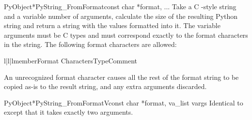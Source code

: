 \begin{cfuncdesc}{PyObject*}{PyString_FromFormat}{const char *format, ...}
  Take a C -style  string and a
  variable number of arguments, calculate the size of the resulting
  Python string and return a string with the values formatted into
  it.  The variable arguments must be C types and must correspond
  exactly to the format characters in the  string.  The
  following format characters are allowed:




  \begin{tableiii}{l|l|l}{member}{Format Characters}{Type}{Comment}
  \end{tableiii}

  An unrecognized format character causes all the rest of the format
  string to be copied as-is to the result string, and any extra
  arguments discarded.
\end{cfuncdesc}

\begin{cfuncdesc}{PyObject*}{PyString_FromFormatV}{const char *format,
                                                   va_list vargs}
  Identical to  except that it takes
  exactly two arguments.
\end{cfuncdesc}

